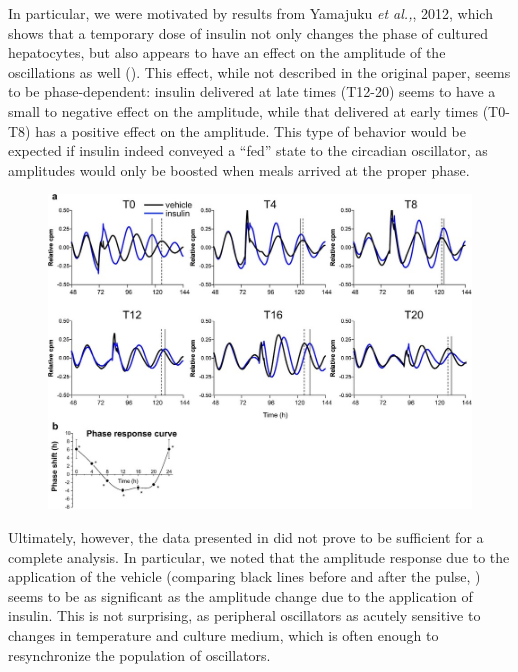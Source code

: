 In particular, we were motivated by results from Yamajuku {\itshape et al.,}, 2012, which shows that a temporary dose of insulin not only changes the phase of cultured hepatocytes, but also appears to have an effect on the amplitude of the oscillations as well ().
This effect, while not described in the original paper, seems to be phase-dependent: insulin delivered at late times (T12-20) seems to have a small to negative effect on the amplitude, while that delivered at early times (T0-T8) has a positive effect on the amplitude.
This type of behavior would be expected if insulin indeed conveyed a ``fed'' state to the circadian oscillator, as amplitudes would only be boosted when meals arrived at the proper phase.

\begin{figure}[tbp]
  \centering
\includegraphics[width=\textwidth]{chap7/figures/yamajuku_arc.jpg}
  \label{fig:yamajuku}
\end{figure}

Ultimately, however, the data presented in \cite{Yamajuku2012} did not prove to be sufficient for a complete analysis.
In particular, we noted that the amplitude response due to the application of the vehicle (comparing black lines before and after the pulse, ) seems to be as significant as the amplitude change due to the application of insulin.
This is not surprising, as peripheral oscillators as acutely sensitive to changes in temperature and culture medium, which is often enough to resynchronize the population of oscillators.

